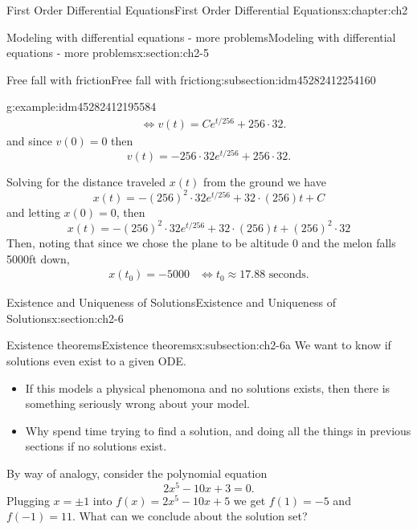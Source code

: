\documentclass[oneside,10pt,]{book}
\numberwithin{equation}{section}
\numberwithin{equation}{section}
\newcommand{\amp}{&}
\begin{document}
\begin{chapterptx}{First Order Differential Equations}{}{First Order Differential Equations}{}{}{x:chapter:ch2}
\begin{sectionptx}{Modeling with differential equations - more problems}{}{Modeling with differential equations - more problems}{}{}{x:section:ch2-5}
\begin{subsectionptx}{Free fall with friction}{}{Free fall with friction}{}{}{g:subsection:idm45282412254160}
\begin{example}{}{g:example:idm45282412195584}
\begin{align*}
\amp \iff v(t)=Ce^{t/256}+256\cdot32.
\end{align*}
and since \(v(0)=0\) then%
\begin{equation*}
v(t)=-256\cdot32e^{t/256}+256\cdot32.
\end{equation*}
%
\par
Solving for the distance traveled \(x(t)\) from the ground we have%
\begin{equation*}
x(t)=-\left(256\right)^{2}\cdot32e^{t/256}+32\cdot\left(256\right)t+C
\end{equation*}
and letting \(x(0)=0\), then%
\begin{equation*}
x(t)=-\left(256\right)^{2}\cdot32e^{t/256}+32\cdot\left(256\right)t+\left(256\right)^{2}\cdot32
\end{equation*}
Then, noting that since we chose the plane to be altitude 0 and the melon falls 5000ft down,%
\begin{align*}
x(t_{0})=-5000 \amp \iff t_{0}\approx17.88\text{ seconds.}
\end{align*}
%
\end{example}
\end{subsectionptx}
\end{sectionptx}
%
%
\typeout{************************************************}
\typeout{************************************************}
%
\begin{sectionptx}{Existence and Uniqueness of Solutions}{}{Existence and Uniqueness of Solutions}{}{}{x:section:ch2-6}
%
%
\typeout{************************************************}
\typeout{************************************************}
%
\begin{subsectionptx}{Existence theorems}{}{Existence theorems}{}{}{x:subsection:ch2-6a}
We want to know if solutions even exist to a given ODE.%
%
\begin{itemize}[label=\textbullet]
\item{}If this models a physical phenomona and no solutions exists, then there is something seriously wrong about your model.%
\item{}Why spend time trying to find a solution, and doing all the things in previous sections if no solutions exist.%
\end{itemize}
By way of analogy, consider the polynomial equation%
\begin{equation*}
2x^{5}-10x+3=0.
\end{equation*}
Plugging \(x=\pm1\) into \(f(x)=2x^{5}-10x+5\) we get \(f(1)=-5\) and \(f(-1)=11\). What can we conclude about the solution set?%

\end{subsectionptx}
\end{sectionptx}
\end{chapterptx}
\end{document}
